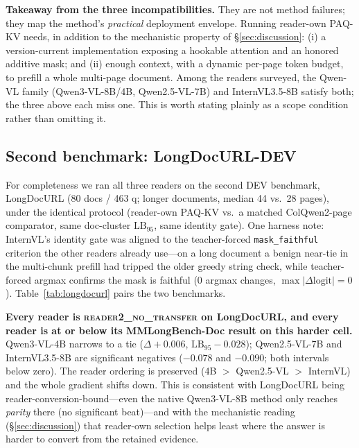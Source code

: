 \documentclass[letterpaper]{article} %
\newcommand{\paqc}{\textsc{PAQ-KV}}
\newcommand{\lb}{\mathrm{LB}_{95}}
\begin{document}
\noindent\textbf{Takeaway from the three incompatibilities.} They are not method failures; they map the method's
\emph{practical} deployment envelope. Running reader-own \paqc{} needs, in addition to the mechanistic property of
\S\ref{sec:discussion}: (i) a version-current implementation exposing a hookable attention and an honored additive
mask; and (ii) enough context, with a dynamic per-page token budget, to prefill a whole multi-page document. Among the
readers surveyed, the Qwen-VL family (Qwen3-VL-8B/4B, Qwen2.5-VL-7B) and InternVL3.5-8B satisfy both; the three above
each miss one. This is worth stating plainly as a scope condition rather than omitting it.

\subsection{Second benchmark: LongDocURL-DEV}
\label{sec:longdocurl}
For completeness we ran all three readers on the second DEV benchmark, LongDocURL (80 docs / 463 q; longer documents,
median 44 vs.\ 28 pages), under the identical protocol (reader-own \paqc{} vs.\ a matched ColQwen2-page comparator,
same doc-cluster $\lb$, same identity gate). One harness note: InternVL's identity gate was aligned to the
teacher-forced \texttt{mask\_faithful} criterion the other readers already use---on a long document a benign near-tie
in the multi-chunk prefill had tripped the older greedy string check, while teacher-forced argmax confirms the mask is
faithful (0 argmax changes, $\max|\Delta\text{logit}|=0$). Table~\ref{tab:longdocurl} pairs the two benchmarks.

\textbf{Every reader is \textsc{reader2\_no\_transfer} on LongDocURL, and every reader is at or below its
MMLongBench-Doc result on this harder cell.} Qwen3-VL-4B narrows to a tie ($\Delta{+}0.006$, $\lb{-}0.028$);
Qwen2.5-VL-7B and InternVL3.5-8B are significant negatives ($-0.078$ and $-0.090$; both intervals below zero). The
reader ordering is preserved (4B $>$ Qwen2.5-VL $>$ InternVL) and the whole gradient shifts down. This is consistent
with LongDocURL being reader-conversion-bound---even the native Qwen3-VL-8B method only reaches \emph{parity} there
(no significant beat)---and with the mechanistic reading (\S\ref{sec:discussion}) that reader-own selection helps
least where the answer is harder to convert from the retained evidence.
\end{document}
